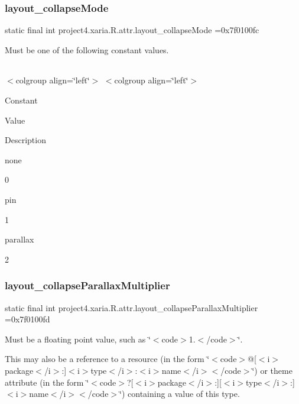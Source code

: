 \subsubsection{\texorpdfstring{layout\+\_\+collapse\+Mode}{layout\_collapseMode}}
{\footnotesize\ttfamily static final int project4.\+xaria.\+R.\+attr.\+layout\+\_\+collapse\+Mode =0x7f0100fc\hspace{0.3cm}{\ttfamily [static]}}

Must be one of the following constant values.

\tabulinesep=1mm
\begin{longtabu} spread 0pt [c]{*{0}{|X[-1]}|}
\hline
\end{longtabu}
$<$colgroup align=\char`\"{}left\char`\"{}$>$ $<$colgroup align=\char`\"{}left\char`\"{}$>$ 

Constant

Value

Description 

{\ttfamily none}

0

{\ttfamily pin}

1

{\ttfamily parallax}

2\mbox{\label{classproject4_1_1xaria_1_1R_1_1attr_aecc13224b7a9bf26d49e3f3e21cb4302}} 
\subsubsection{\texorpdfstring{layout\+\_\+collapse\+Parallax\+Multiplier}{layout\_collapseParallaxMultiplier}}
{\footnotesize\ttfamily static final int project4.\+xaria.\+R.\+attr.\+layout\+\_\+collapse\+Parallax\+Multiplier =0x7f0100fd\hspace{0.3cm}{\ttfamily [static]}}

Must be a floating point value, such as \char`\"{}$<$code$>$1.$<$/code$>$\char`\"{}. 

This may also be a reference to a resource (in the form \char`\"{}$<$code$>$@\mbox{[}$<$i$>$package$<$/i$>$\+:\mbox{]}$<$i$>$type$<$/i$>$\+:$<$i$>$name$<$/i$>$$<$/code$>$\char`\"{}) or theme attribute (in the form \char`\"{}$<$code$>$?\mbox{[}$<$i$>$package$<$/i$>$\+:\mbox{]}\mbox{[}$<$i$>$type$<$/i$>$\+:\mbox{]}$<$i$>$name$<$/i$>$$<$/code$>$\char`\"{}) containing a value of this type. \mbox{\label{classproject4_1_1xaria_1_1R_1_1attr_abcc3b4c704e84132d714bca10de69825}} 
